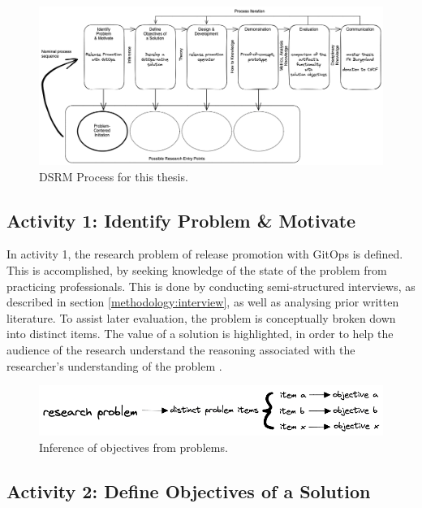 \begin{figure}[h]
	\centering
	\includegraphics[width=1.00\linewidth]{figures/dsrm-process-release-promotion-gitops.png}
	\caption{DSRM Process for this thesis.
	}
	\label{fig:dsrmProcessReleasePromotionGitOps}	
\end{figure}

\subsection{Activity 1: Identify Problem \& Motivate}
\label{methodology:activity1}

\noindent
In activity 1,
the research problem of
release promotion with GitOps
is defined.
This is accomplished, by
seeking knowledge of the state of the problem
from practicing professionals.
This is done by conducting
semi-structured interviews, as described in section \ref{methodology:interview},
as well as analysing prior written literature.
To assist later evaluation,
the problem is conceptually broken down into distinct items.
The value of a solution is highlighted,
in order to help the audience of the research
understand the reasoning associated with the
researcher's understanding of the problem
\autocite{designScienceResearchMethodologyForInformationSystemsResearch}.
\bigskip

\begin{figure}[h]
	\centering
	\includegraphics[width=0.75\linewidth]{assets/problem-to-objective-mapping.png}
	\caption{Inference of objectives from problems.
	}
	\label{fig:problemToObjectiveMapping}	
\end{figure}

\subsection{Activity 2: Define Objectives of a Solution}
\label{methodology:activity2}

